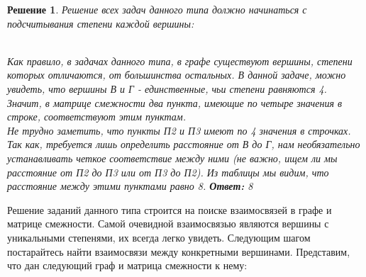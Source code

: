 \documentclass[12pt]{article}
\theoremstyle{problem_style}
\newtheorem{solution}{Решение}[subsection]
\begin{document}
\break
\begin{solution}
Решение всех задач данного типа должно начинаться с подсчитывания степени каждой вершины:
\begin{figure}[h]
    \centering
\end{figure}\\
Как правило, в задачах данного типа, в графе существуют вершины, степени которых отличаются, от большинства остальных. В данной задаче, можно увидеть, что вершины В и Г - единственные, чьи степени равняются 4. Значит, в матрице смежности два пункта, имеющие по четыре значения в строке, соответствуют этим пунктам.\\
Не трудно заметить, что пункты П2 и П3 имеют по 4 значения в строчках. Так как, требуется лишь определить расстояние от В до Г, нам необязательно устанавливать четкое соответствие между ними (не важно, ищем ли мы расстояние от П2 до П3 или от П3 до П2). Из таблицы мы видим, что расстояние между этими пунктами равно 8.
\textbf{Ответ:} 8
\end{solution}
Решение заданий данного типа строится на поиске взаимосвязей в графе и матрице смежности. Самой очевидной взаимосвязью являются вершины с уникальными степенями, их всегда легко увидеть. Следующим шагом постарайтесь найти взаимосвязи между конкретными вершинами. Представим, что дан следующий граф и матрица смежности к нему:
\end{document}
